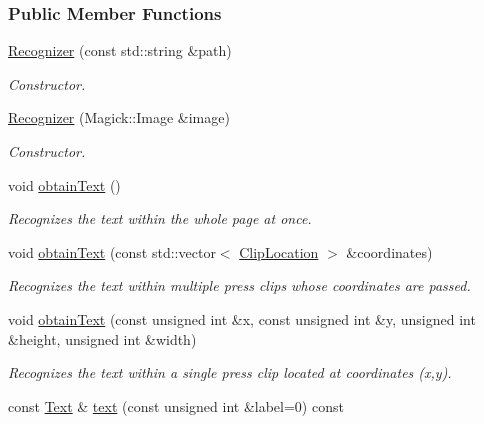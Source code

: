 \subsubsection*{Public Member Functions}
\begin{CompactItemize}
\item 
\hyperlink{class_recognizer_50ffc181208bb07ae651aba6249ee7e4}{Recognizer} (const std::string \&path)
\begin{CompactList}\small\item\em Constructor. \item\end{CompactList}\item 
\hyperlink{class_recognizer_01e0b85a6ad9cfbf6fcab4fe4b294640}{Recognizer} (Magick::Image \&image)
\begin{CompactList}\small\item\em Constructor. \item\end{CompactList}\item 
void \hyperlink{class_recognizer_008a0ea69a912ff54882dd20d18adcf9}{obtainText} ()
\begin{CompactList}\small\item\em Recognizes the text within the whole page at once. \item\end{CompactList}\item 
void \hyperlink{class_recognizer_4b3b27b3746edcf831d142eddfb81f19}{obtainText} (const std::vector$<$ \hyperlink{class_clip_location}{ClipLocation} $>$ \&coordinates)
\begin{CompactList}\small\item\em Recognizes the text within multiple press clips whose coordinates are passed. \item\end{CompactList}\item 
void \hyperlink{class_recognizer_d117f344b1f77711e6cbab0f15dbc269}{obtainText} (const unsigned int \&x, const unsigned int \&y, unsigned int \&height, unsigned int \&width)
\begin{CompactList}\small\item\em Recognizes the text within a single press clip located at coordinates (x,y). \item\end{CompactList}\item 
const \hyperlink{class_text}{Text} \& \hyperlink{class_recognizer_c5d20b511888a60a6c1a81c0a4206ec2}{text} (const unsigned int \&label=0) const 

\end{CompactItemize}
